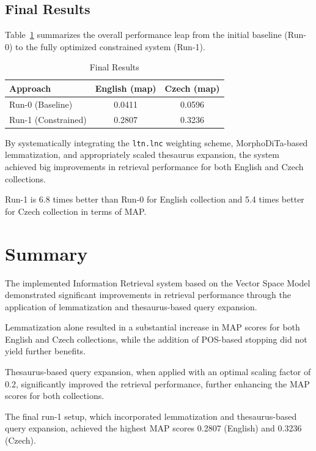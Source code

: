 \documentclass[a4paper, 12pt]{article}
\begin{document}
\FloatBarrier

\subsection{Final Results}

Table~\ref{tab:final_results} summarizes the overall performance leap from the initial baseline (Run-0) to the fully optimized constrained system (Run-1).

\begin{table}[h]
    \centering
    \begin{tabular}[t]{lcc} 
        \hline
        \textbf{Approach} & \textbf{English} (map) & \textbf{Czech} (map) \\ 
        \hline
         Run-0 (Baseline) & 0.0411 & 0.0596\\
         Run-1 (Constrained) & 0.2807 & 0.3236 \\
        \hline
    \end{tabular}
    \caption{Final Results}
    \label{tab:final_results}
\end{table}

By systematically integrating the \texttt{ltn.lnc} weighting scheme, MorphoDiTa-based lemmatization, and appropriately scaled thesaurus expansion, the system achieved big improvements in retrieval performance for both English and Czech collections.

Run-1 is 6.8 times better than Run-0 for English collection and 5.4 times better for Czech collection in terms of MAP.

\section{Summary}
The implemented Information Retrieval system based on the Vector Space Model demonstrated significant improvements in retrieval performance through the application of lemmatization and thesaurus-based query expansion.

Lemmatization alone resulted in a substantial increase in MAP scores for both English and Czech collections, while the addition of POS-based stopping did not yield further benefits.

Thesaurus-based query expansion, when applied with an optimal scaling factor of 0.2, significantly improved the retrieval performance, further enhancing the MAP scores for both collections.

The final run-1 setup, which incorporated lemmatization and thesaurus-based query expansion, achieved the highest MAP scores 0.2807 (English) and 0.3236 (Czech).



\end{document}
